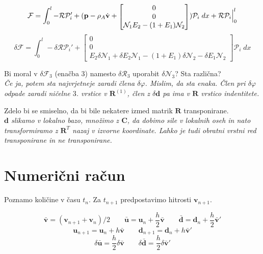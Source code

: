 \documentclass{article}
\begin{document}
$$\mathcal{F} = \int_0^l-\mathcal{R}\mathcal{P}_i' + (\mathbf{p}-\rho_A \dot{\mathbf{v}} + {\scriptscriptstyle \begin{bmatrix} 0\\ 0\\ \mathcal{N}_1E_2 - (1+E_1) \mathcal{N}_2 \end{bmatrix}}) \mathcal{P}_i \; dx + \mathcal{R}\mathcal{P}_i\Bigl |_0^l$$
$$\delta \mathcal{F} = \int_0^l- \delta \mathcal{RP}_i' + {\scriptscriptstyle \begin{bmatrix} 0\\ 0\\ E_2\delta\mathcal{N}_1+\delta E_2 \mathcal{N}_1-(1+E_1)\delta \mathcal{N}_2 - \delta E_1 \mathcal{N}_2 \end{bmatrix}}\mathcal{P}_i\; dx$$


Bi moral v $\delta\mathcal{F}_3$ (enačba 3) namesto $\delta\mathcal{R}_3$ uporabit $\delta\mathcal{N}_3$? Sta različna?\\
{\it Če ja, potem sta najvrjetneje zaradi člena $\delta\varphi$. Mislim, da sta enaka. Člen pri $\delta\varphi$ odpade zaradi ničelne $3$. vrstice v $\mathbf{R}^{(1)}$, člen z $\delta\mathbf{d}$ pa ima v $\mathbf{R}$ vrstico indentitete.}


Zdelo bi se smiselno, da bi bile nekatere izmed matrik $\mathbf{R}$ transponirane.\\
{\it $\mathbf{d}$ slikamo v lokalno bazo, množimo z $\mathbf{C}$, da dobimo sile v lokalnih oseh in nato transformiramo z $\mathbf{R}^T$ nazaj v izvorne koordinate. Lahko je tudi obratni vrstni red transponirane in ne transponirane.}







\newpage
\section{Numerični račun}
Poznamo količine v času $t_n$. Za $t_{n+1}$ predpostavimo hitrosti $\mathbf{v}_{n+1}$.

$$\bar{\mathbf{v}} = (\mathbf{v}_{n+1} + \mathbf{v}_{n})/2 \qquad \bar{\mathbf{u}} = \mathbf{u}_{n} + \frac{h}{2}\bar{\mathbf{v}} \qquad \bar{\mathbf{d}} = \mathbf{d}_n + \frac{h}{2}\bar{\mathbf{v}}' $$
$$\mathbf{u}_{n+1} = \mathbf{u}_n+h\bar{\mathbf{v}} \qquad \mathbf{d}_{n+1} = \mathbf{d}_n+h\bar{\mathbf{v}}'$$ 
$$ \delta\bar{\mathbf{u}} = \frac{h}{2}\delta\bar{\mathbf{v}} \qquad  \delta\bar{\mathbf{d}} = \frac{h}{2}\delta\bar{\mathbf{v}}'$$ 
\end{document}
